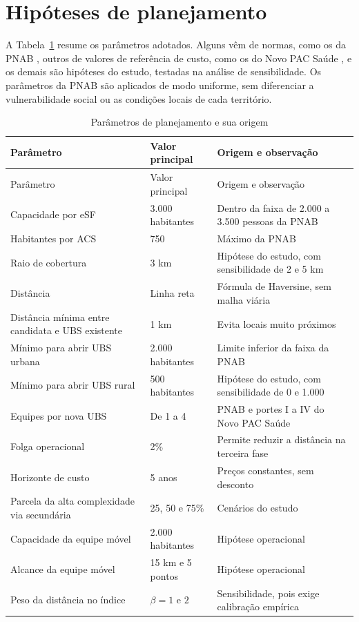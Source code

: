 \section{Hipóteses de planejamento}
A Tabela~\ref{tab:hipoteses} resume os parâmetros adotados. Alguns vêm de normas, como os da PNAB
\citep{pnab2017}, outros de valores de referência de custo, como os do Novo PAC Saúde
\citep{novopac2025}, e os demais são hipóteses do estudo, testadas na análise de sensibilidade. Os
parâmetros da PNAB são aplicados de modo uniforme, sem diferenciar a vulnerabilidade social ou as
condições locais de cada território.

\begin{longtable}{p{.26\linewidth}p{.19\linewidth}p{.44\linewidth}}
\caption{Parâmetros de planejamento e sua origem}\label{tab:hipoteses}\\
\toprule Parâmetro & Valor principal & Origem e observação\\\midrule\endfirsthead
\toprule Parâmetro & Valor principal & Origem e observação\\\midrule\endhead
Capacidade por eSF & 3.000 habitantes & Dentro da faixa de 2.000 a 3.500 pessoas da PNAB\\
Habitantes por ACS & 750 & Máximo da PNAB\\
Raio de cobertura & 3 km & Hipótese do estudo, com sensibilidade de 2 e 5 km\\
Distância & Linha reta & Fórmula de Haversine, sem malha viária\\
Distância mínima entre candidata e UBS existente & 1 km & Evita locais muito próximos\\
Mínimo para abrir UBS urbana & 2.000 habitantes & Limite inferior da faixa da PNAB\\
Mínimo para abrir UBS rural & 500 habitantes & Hipótese do estudo, com sensibilidade de 0 e 1.000\\
Equipes por nova UBS & De 1 a 4 & PNAB e portes I a IV do Novo PAC Saúde\\
Folga operacional & 2\% & Permite reduzir a distância na terceira fase\\
Horizonte de custo & 5 anos & Preços constantes, sem desconto\\
Parcela da alta complexidade via secundária & 25, 50 e 75\% & Cenários do estudo\\
Capacidade da equipe móvel & 2.000 habitantes & Hipótese operacional\\
Alcance da equipe móvel & 15 km e 5 pontos & Hipótese operacional\\
Peso da distância no índice & $\beta=1$ e $2$ & Sensibilidade, pois exige calibração empírica \citep{guagliardo2004}\\
\bottomrule
\end{longtable}

